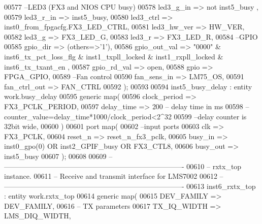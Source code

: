 \begin{DoxyCode}
00577 \textcolor{keyword}{      --LED3 (FX3 and NIOS CPU busy)}
00578       led3_g_in            => \textcolor{keywordflow}{not} inst5\_busy ,
00579       led3_r_in            => inst5_busy,
00580       led3_ctrl            => inst0\_from\_fpgacfg.FX3\_LED\_CTRL,
00581       led3_hw_ver          => HW_VER,
00582       led3_g               => FX3_LED_G,
00583       led3_r               => FX3_LED_R,     
00584 \textcolor{keyword}{      --GPIO}
00585       gpio_dir             => \textcolor{vhdlchar}{(}\textcolor{keywordflow}{others}=>'1'\textcolor{vhdlchar}{)},
00586       gpio_out_val         => "\textcolor{vhdllogic}{0000}" & inst6\_tx\_pct\_loss\_flg & inst1\_txpll\_locked & inst1\_rxpll\_locked & 
      inst6\_tx\_txant\_en        ,
00587       gpio_rd_val          => \textcolor{keywordflow}{open},
00588       gpio                 => FPGA_GPIO,      
00589 \textcolor{keyword}{      --Fan control}
00590       fan_sens_in          => LM75_OS,
00591       fan_ctrl_out         => FAN_CTRL
00592    \textcolor{vhdlchar}{)};
00593    
00594    inst5\_busy\_delay : \textcolor{keywordflow}{entity} work.busy_delay
00595    \textcolor{keywordflow}{generic} \textcolor{keywordflow}{map}(
00596       clock_period   => FX3_PCLK_PERIOD,
00597       delay_time     => \textcolor{vhdllogic}{200}  \textcolor{keyword}{-- delay time in ms}
00598 \textcolor{keyword}{      --counter\_value=delay\_time*1000/clock\_period<2^32}
00599 \textcolor{keyword}{      --delay counter is 32bit wide, }
00600    \textcolor{vhdlchar}{)}
00601    \textcolor{keywordflow}{port} \textcolor{keywordflow}{map}(
00602 \textcolor{keyword}{      --input ports }
00603       clk      => FX3_PCLK,
00604       reset_n  => reset_n_fx3_pclk,
00605       busy_in  => inst0_gpo\textcolor{vhdlchar}{(}\textcolor{vhdllogic}{0}\textcolor{vhdlchar}{)} \textcolor{keywordflow}{OR} inst2_GPIF_busy \textcolor{keywordflow}{OR} FX3_CTL8,
00606       busy_out => inst5_busy
00607    \textcolor{vhdlchar}{)};
00608    
00609 \textcolor{keyword}{-- ----------------------------------------------------------------------------}
00610 \textcolor{keyword}{-- rxtx\_top instance.}
00611 \textcolor{keyword}{-- Receive and transmit interface for LMS7002}
00612 \textcolor{keyword}{-- ----------------------------------------------------------------------------}
00613    inst6\_rxtx\_top : \textcolor{keywordflow}{entity} work.rxtx_top
00614    \textcolor{keywordflow}{generic} \textcolor{keywordflow}{map}(
00615       DEV_FAMILY              => DEV_FAMILY,
00616 \textcolor{keyword}{      -- TX parameters}
00617       TX_IQ_WIDTH             => LMS_DIQ_WIDTH,

\end{DoxyCode}
